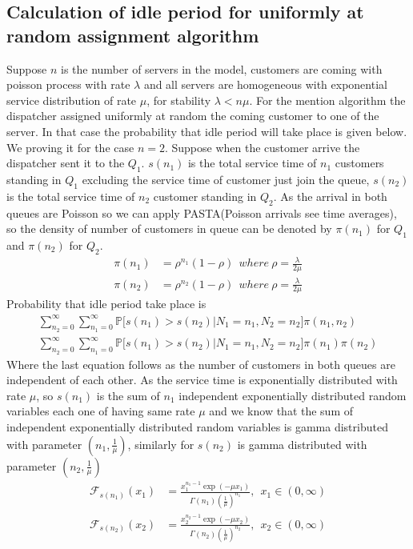 \documentclass[a4paper,english,11pt]{article}
\begin{document}
\subsection{Calculation of idle period for uniformly at random assignment algorithm}
 Suppose $n$ is the number of servers in the model, customers are coming with poisson process with rate $\lambda$ and all servers are homogeneous with exponential service distribution of rate $\mu$, for stability $\lambda < n\mu$. For the mention algorithm the dispatcher assigned uniformly at random the coming customer to one of the server. In that case the probability that idle period will take place is given below. We proving it for the case $n=2$. Suppose when the customer arrive the dispatcher sent it to the $Q_1$. $s(n_1)$ is the total service time of $n_1$ customers standing in $Q_1$ excluding the service time of customer just join the queue, $s(n_2)$ is the total service time of $n_2$ customer standing in $Q_2$. As the arrival in both queues are Poisson so we can apply PASTA(Poisson arrivals see time averages), so the density of number of customers in queue can be denoted by $\pi(n_1)$ for $Q_1$ and $\pi(n_2)$ for $Q_2$.
 \begin{align*} 
 \pi(n_1) &= \rho ^{n_1}(1 - \rho) \ \ where\ \rho = \frac{\lambda}{2 \mu}\\
 \pi(n_2) &= \rho ^{n_2}(1 - \rho) \ \ where\ \rho = \frac{\lambda}{2 \mu}
 \end{align*}
 Probability that idle period take place is
 \begin{align}
 \sum_{n_2=0}^{\infty}\sum_{n_1=0}^{\infty} \mathbb{P}\bigg[s(n_1) > s(n_2) | N_1 =n_1, N_2 =n_2\bigg] \pi(n_1,n_2)\\
 \sum_{n_2=0}^{\infty}\sum_{n_1=0}^{\infty} \mathbb{P}\bigg[s(n_1) > s(n_2) | N_1 =n_1, N_2 =n_2\bigg] \pi(n_1)\pi(n_2)
 \end{align}
Where the last equation follows as the number of customers in both queues are independent of each other. As the service time is exponentially distributed with rate $\mu$, so $s(n_1)$ is the sum of $n_1$ independent exponentially distributed random variables each one of having same rate $\mu$ and we know that the sum of independent exponentially distributed random variables is gamma distributed with parameter $(n_1, \frac{1}{\mu})$, similarly for $s(n_2)$ is gamma distributed with parameter $(n_2,\frac{1}{\mu})$
\begin{align*}
\mathcal{F}_{s(n_1)}(x_1) &= \frac{x_1^{n_1 - 1} \exp(- \mu x_1)}{\Gamma(n_1)(\frac{1}{\mu})^{n_1}}, \ \ x_1 \in (0, \infty)\\
\mathcal{F}_{s(n_2)}(x_2) &= \frac{x_2^{n_2 - 1} \exp(- \mu x_2)}{\Gamma(n_2)(\frac{1}{\mu})^{n_2}}, \ \ x_2 \in (0, \infty)
\end{align*}
\end{document}
